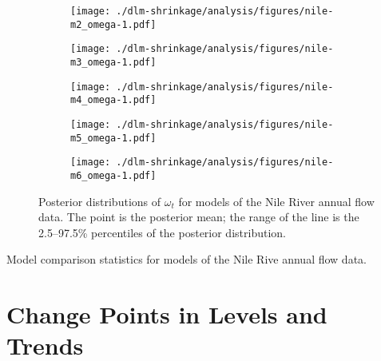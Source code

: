 \documentclass[12pt]{article}
\begin{document}
\begin{figure}[htpb!]
  \centering
  \begin{subfigure}[b]{0.5\linewidth}
    \texttt{[image: ./dlm-shrinkage/analysis/figures/nile-m2\_omega-1.pdf]}
    \caption{}
  \end{subfigure}%
  \begin{subfigure}[b]{0.5\linewidth}
    \texttt{[image: ./dlm-shrinkage/analysis/figures/nile-m3\_omega-1.pdf]}
    \caption{}
  \end{subfigure}
  \begin{subfigure}[b]{0.5\linewidth}
    \texttt{[image: ./dlm-shrinkage/analysis/figures/nile-m4\_omega-1.pdf]}
    \caption{}
  \end{subfigure}%
  \begin{subfigure}[b]{0.5\linewidth}
    \texttt{[image: ./dlm-shrinkage/analysis/figures/nile-m5\_omega-1.pdf]}
    \caption{}
  \end{subfigure}
  \begin{subfigure}[b]{0.5\linewidth}
    \texttt{[image: ./dlm-shrinkage/analysis/figures/nile-m6\_omega-1.pdf]}
    \caption{}
  \end{subfigure}
  \caption[Posterior distributions of $\omega_t$ for models of the Nile River annual flow data]{Posterior distributions of $\omega_t$ for models of the Nile River annual flow data. The point is the posterior mean; the range of the line is the 2.5--97.5\% percentiles of the posterior distribution.}
  \label{dlm:fig:nile_omega_posterior}
\end{figure}



\begin{table}[thbp]
  \centering
  
  \caption{Model comparison statistics for models of the Nile Rive annual flow data.}
  \label{dlm:tab:nile-model_comp}
\end{table}


\section{Change Points in Levels and Trends}
\label{dlm:sec:linear-filtering}
\end{document}
